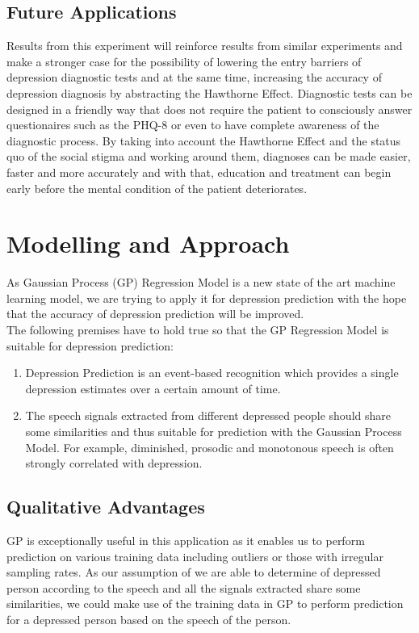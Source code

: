 \documentclass{article}
\begin{document}
	\subsection{Future Applications}
	Results from this experiment will reinforce results from similar experiments and make a stronger case for the possibility of lowering the entry barriers of depression diagnostic tests and at the same time, increasing the accuracy of depression diagnosis by abstracting the Hawthorne Effect. 
	Diagnostic tests can be designed in a friendly way that does not require the patient to consciously answer questionaires such as the PHQ-8 or even to have complete awareness of the diagnostic process. 
	By taking into account the Hawthorne Effect and the status quo of the social stigma and working around them, diagnoses can be made easier, faster and more accurately and with that, education and treatment can begin early before the mental condition of the patient deteriorates.
	
	\section{Modelling and Approach}
	As Gaussian Process (GP) Regression Model is a new state of the art machine learning model, we are trying to apply it for depression prediction 
	with the hope that the accuracy of depression prediction will be improved. \\	
	
	The following premises have to hold true so that the GP Regression Model is suitable for depression prediction:
	\begin{enumerate}
		\item Depression Prediction is an event-based recognition which provides a single depression estimates over a certain amount of time. \cite{Valstar2016}
		\item The speech signals extracted from different depressed people should share some similarities and thus suitable for prediction with the Gaussian Process Model. 
		For example, diminished, prosodic and monotonous speech is often strongly correlated with depression.\cite{Cummins2015}
	\end{enumerate}

	\subsection{Qualitative Advantages}
	GP is exceptionally useful in this application as it enables us to perform prediction on various training data including outliers or 
	those with irregular sampling rates. As our assumption of we are able to determine of depressed person according to the speech and all 
	the signals extracted share some similarities, we could make use of the training data in GP to perform prediction for a depressed person based on the speech of the person.\\
\end{document}
